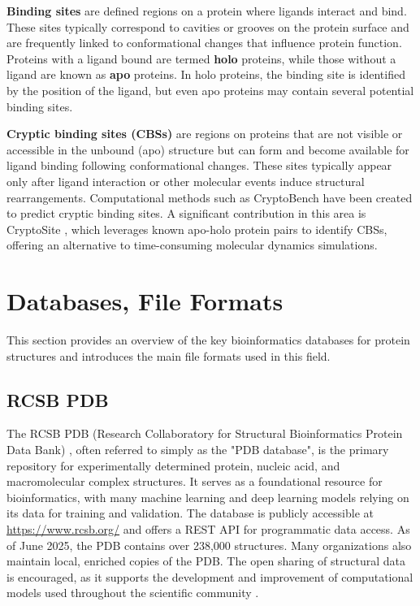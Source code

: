 \textbf{Binding sites} are defined regions on a protein where ligands interact and bind. These sites typically correspond to cavities or grooves on the protein surface and are frequently linked to conformational changes that influence protein function. Proteins with a ligand bound are termed \textbf{holo} proteins, while those without a ligand are known as \textbf{apo} proteins. In holo proteins, the binding site is identified by the position of the ligand, but even apo proteins may contain several potential binding sites.

\textbf{Cryptic binding sites (CBSs)} are regions on proteins that are not visible or accessible in the unbound (apo) structure but can form and become available for ligand binding following conformational changes. These sites typically appear only after ligand interaction or other molecular events induce structural rearrangements. Computational methods such as CryptoBench \cite{vskrhak2025cryptobench} have been created to predict cryptic binding sites. A significant contribution in this area is CryptoSite \cite{cimermancic2016cryptosite}, which leverages known apo-holo protein pairs to identify CBSs, offering an alternative to time-consuming molecular dynamics simulations.

\section{Databases, File Formats}
\label{sec:dbs-formats}

This section provides an overview of the key bioinformatics databases for protein structures and introduces the main file formats used in this field.

\subsection{RCSB PDB}
\label{sec:rcsb-pdb}

The RCSB PDB (Research Collaboratory for Structural Bioinformatics Protein Data Bank) \cite{berman2000protein}, often referred to simply as the "PDB database", is the primary repository for experimentally determined protein, nucleic acid, and macromolecular complex structures. It serves as a foundational resource for bioinformatics, with many machine learning and deep learning models relying on its data for training and validation. The database is publicly accessible at \url{https://www.rcsb.org/} and offers a REST API for programmatic data access. As of June 2025, the PDB contains over 238,000 structures. Many organizations also maintain local, enriched copies of the PDB. The open sharing of structural data is encouraged, as it supports the development and improvement of computational models used throughout the scientific community \cite{callaway2025alphafold}.

